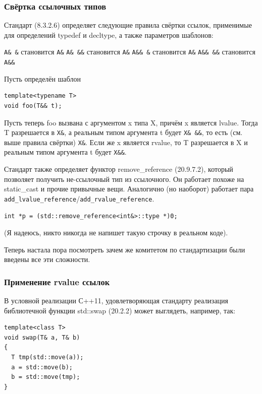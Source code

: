 \documentclass[a4paper,12pt,oneside]{article}
\begin{document}
\subsubsection{Свёртка ссылочных типов}

Стандарт (8.3.2.6) определяет следующие правила свёртки ссылок, применимые для определений typedef и decltype, а также параметров шаблонов:

\lstinline!A& &! становится \lstinline!A&!
\lstinline!A& &&! становится \lstinline!A&!
\lstinline!A&& &! становится \lstinline!A&!
\lstinline!A&& &&! становится \lstinline!A&&!

Пусть определён шаблон

\begin{lstlisting}
template<typename T>
void foo(T&& t);
\end{lstlisting}

Пусть теперь foo вызвана с аргументом x типа X, причём x является lvalue. Тогда T разрешается в \lstinline!X&!, а реальным типом аргумента t будет \lstinline!X& &&!, то есть (см. выше правила свёртки) \lstinline!X&!. Если же x является rvalue, то T разрешается в X и реальным типом аргумента t будет \lstinline!X&&!.

Стандарт также определяет функтор remove\_reference (20.9.7.2), который позволяет получить не-ссылочный тип из ссылочного. Он работает похоже на static\_cast и прочие привычные вещи. Аналогично (но наоборот) работает пара \lstinline!add_lvalue_reference!/\lstinline!add_rvalue_reference!.

\begin{lstlisting}
int *p = (std::remove_reference<int&>::type *)0;
\end{lstlisting}

(Я надеюсь, никто никогда не напишет такую строчку в реальном коде).

Теперь настала пора посмотреть зачем же комитетом по стандартизации были введены все эти сложности.

\subsubsection{Применение rvalue ссылок}

В условной реализации С++11, удовлетворяющая стандарту реализация библиотечной функции std::swap (20.2.2) может выглядеть, например, так:

\begin{lstlisting}
template<class T> 
void swap(T& a, T& b) 
{ 
  T tmp(std::move(a));
  a = std::move(b); 
  b = std::move(tmp);
} 
\end{lstlisting}
\end{document}
